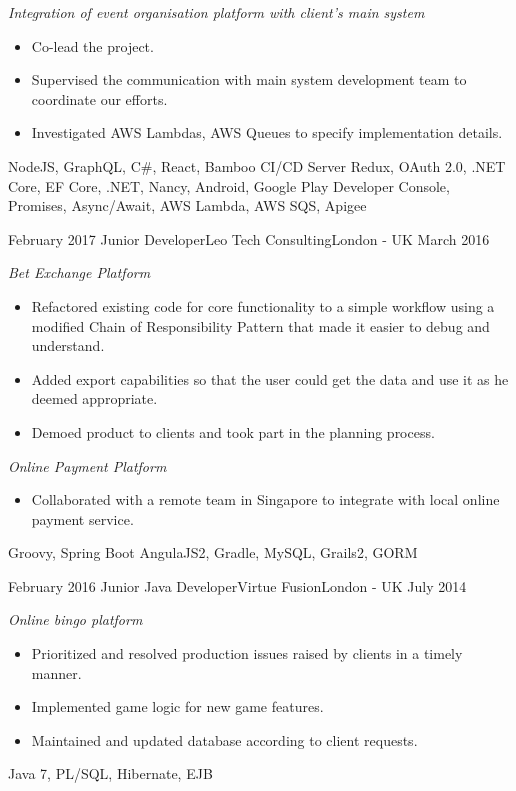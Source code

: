 \begin{experiences}
{        \emph{Integration of event organisation platform with client's main system}
        \begin{itemize}
          \item Co-lead the project.
          \item Supervised the communication with main system development team to coordinate our efforts.
          \item Investigated AWS Lambdas, AWS Queues to specify implementation details.
        \end{itemize}
      }
      {NodeJS, GraphQL, C\#, React, Bamboo CI/CD Server}
      {Redux, OAuth 2.0, .NET Core, EF Core, .NET, Nancy, Android, Google Play Developer Console, Promises, Async/Await, AWS Lambda, AWS SQS, Apigee}
    \emptySeparator

    \experience
      {February 2017}
      {Junior Developer}{Leo Tech Consulting}{London - UK}
      {March 2016}
      {
        \emph{Bet Exchange Platform}
        \begin{itemize}
          \item Refactored existing code for core functionality to a simple workflow using a modified Chain of Responsibility Pattern that made it easier to debug and understand.
          \item Added export capabilities so that the user could get the data and use it as he deemed appropriate.
          \item Demoed product to clients and took part in the planning process.
        \end{itemize}

        \emph{Online Payment Platform}
        \begin{itemize}
          \item Collaborated with a remote team in Singapore to integrate with local online payment service.
        \end{itemize}
      }
      {Groovy, Spring Boot}
      {AngulaJS2, Gradle, MySQL, Grails2, GORM}
    \emptySeparator

    \experience
      {February 2016}
      {Junior Java Developer}{Virtue Fusion}{London - UK}
      {July 2014}
      {
        \emph{Online bingo platform}
        \begin{itemize}
          \item Prioritized and resolved production issues raised by clients in a timely manner.
          \item Implemented game logic for new game features.
          \item Maintained and updated database according to client requests.
        \end{itemize}
      }
      {}
      {Java 7, PL/SQL, Hibernate, EJB}
    \emptySeparator


\end{experiences}
